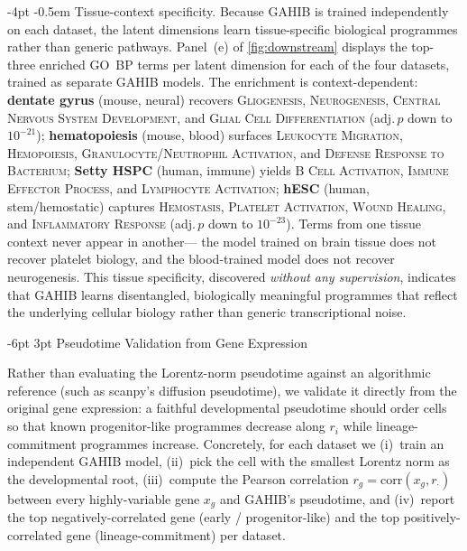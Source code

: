 \documentclass[preprint,12pt]{elsarticle}
\makeatletter
\renewcommand\subsection{\@startsection{subsection}{2}{\z@}%
  {-6pt \@plus -2pt \@minus -2pt}%
  {3pt \@plus 1pt \@minus 1pt}%
  {\normalfont\large\bfseries}}
\renewcommand\paragraph{\@startsection{paragraph}{4}{\z@}%
  {-4pt \@plus -1pt \@minus -1pt}%
  {-0.5em}%
  {\normalfont\normalsize\bfseries}}
\makeatother
\begin{document}
\paragraph{Tissue-context specificity.}
Because GAHIB is trained independently on each dataset, the latent
dimensions learn tissue-specific biological programmes rather than
generic pathways.
Panel~(e) of \cref{fig:downstream} displays the top-three enriched
GO~BP terms per latent dimension for each of the four datasets,
trained as separate GAHIB models.
The enrichment is context-dependent:
\textbf{dentate gyrus} (mouse, neural) recovers
\textsc{Gliogenesis}, \textsc{Neurogenesis},
\textsc{Central Nervous System Development}, and
\textsc{Glial Cell Differentiation}
(adj.\,$p$ down to $10^{-21}$);
\textbf{hematopoiesis} (mouse, blood) surfaces
\textsc{Leukocyte Migration}, \textsc{Hemopoiesis},
\textsc{Granulocyte/Neutrophil Activation}, and
\textsc{Defense Response to Bacterium};
\textbf{Setty HSPC} (human, immune) yields
\textsc{B Cell Activation}, \textsc{Immune Effector Process},
and \textsc{Lymphocyte Activation};
\textbf{hESC} (human, stem/hemostatic) captures
\textsc{Hemostasis}, \textsc{Platelet Activation},
\textsc{Wound Healing}, and \textsc{Inflammatory Response}
(adj.\,$p$ down to $10^{-23}$).
Terms from one tissue context never appear in another---%
the model trained on brain tissue does not recover platelet biology,
and the blood-trained model does not recover neurogenesis.
This tissue specificity, discovered \emph{without any supervision},
indicates that GAHIB learns disentangled, biologically meaningful
programmes that reflect the underlying cellular biology rather than
generic transcriptional noise.

\subsection{Pseudotime Validation from Gene Expression}\label{sec:pseudotime}

Rather than evaluating the Lorentz-norm pseudotime against an
algorithmic reference (such as scanpy's diffusion pseudotime), we
validate it directly from the original gene expression: a faithful
developmental pseudotime should order cells so that known
progenitor-like programmes decrease along $r_i$ while
lineage-commitment programmes increase.
Concretely, for each dataset we (i)~train an independent GAHIB
model, (ii)~pick the cell with the smallest Lorentz norm as the
developmental root, (iii)~compute the Pearson correlation
$r_g = \mathrm{corr}(x_g, r_{\cdot})$ between every highly-variable
gene $x_g$ and GAHIB's pseudotime, and (iv)~report the top
negatively-correlated gene (early / progenitor-like) and the top
positively-correlated gene (lineage-commitment) per dataset.
\end{document}
